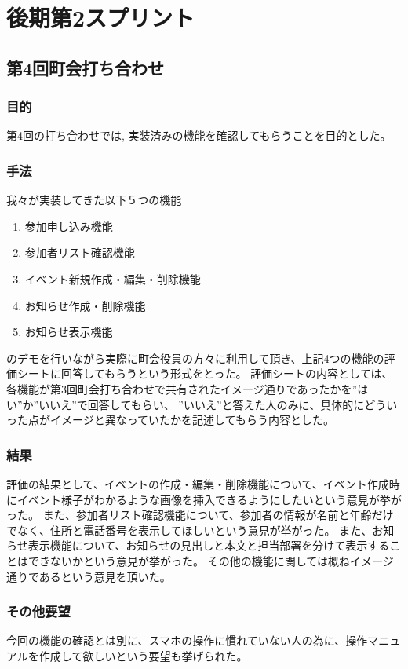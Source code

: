 \section{後期第2スプリント}
\subsection{第4回町会打ち合わせ}
\subsubsection{目的}
第4回の打ち合わせでは, 実装済みの機能を確認してもらうことを目的とした。
\subsubsection{手法}
我々が実装してきた以下５つの機能
\begin{enumerate}
    \item 参加申し込み機能
    \item 参加者リスト確認機能
    \item イベント新規作成・編集・削除機能
    \item お知らせ作成・削除機能
    \item お知らせ表示機能
\end{enumerate}
のデモを行いながら実際に町会役員の方々に利用して頂き、上記4つの機能の評価シートに回答してもらうという形式をとった。
評価シートの内容としては、各機能が第3回町会打ち合わせで共有されたイメージ通りであったかを”はい”か”いいえ”で回答してもらい、
”いいえ”と答えた人のみに、具体的にどういった点がイメージと異なっていたかを記述してもらう内容とした。
\subsubsection{結果}
評価の結果として、イベントの作成・編集・削除機能について、イベント作成時にイベント様子がわかるような画像を挿入できるようにしたいという意見が挙がった。
また、参加者リスト確認機能について、参加者の情報が名前と年齢だけでなく、住所と電話番号を表示してほしいという意見が挙がった。
また、お知らせ表示機能について、お知らせの見出しと本文と担当部署を分けて表示することはできないかという意見が挙がった。
その他の機能に関しては概ねイメージ通りであるという意見を頂いた。
\subsubsection{その他要望}
今回の機能の確認とは別に、スマホの操作に慣れていない人の為に、操作マニュアルを作成して欲しいという要望も挙げられた。

